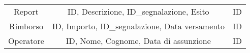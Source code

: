 \begin{center}
\begin{tabular}{ |c|c|c|}
\multirow{3}{6em}{Report} & \multirow{3}{8em}{ID, Descrizione, ID\_segnalazione, Esito} & \multirow{3}{12em}{ID} \\
&  & \\
&  & \\ 
\hline

\multirow{3}{6em}{Rimborso} & \multirow{3}{8em}{ID, Importo, ID\_segnalazione, Data versamento} & \multirow{3}{12em}{ID} \\
&  & \\
&  & \\ 
\hline

\multirow{3}{6em}{Operatore} & \multirow{3}{8em}{ID, Nome, Cognome, Data di assunzione} & \multirow{3}{12em}{ID} \\
&  & \\
&  & \\ 
\hline
\end{tabular}
\end{center}